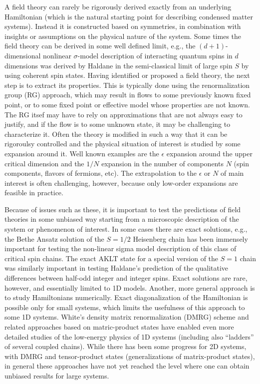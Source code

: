 \documentclass[range]{ar2e}
\begin{document}
A field theory can rarely be rigorously derived exactly from 
an underlying Hamiltonian (which is the natural starting point for describing condensed matter systems). Instead
it is constructed based on symmetries, in combination with insights or assumptions on the physical nature of the
system. Some times the field theory can be derived in some well defined limit, e.g., the $(d+1)$-dimensional
nonlinear $\sigma$-model description of interacting quantum spins in $d$ dimensions was derived by Haldane in 
the semi-classical limit of large spin $S$ by using coherent spin states. Having identified or proposed a field
theory, the next step is to extract its properties. This is typically done using the renormalization group (RG)
approach, which may result in flows to some previously known fixed point, or to some fixed point or effective
model whose properties are not known. The RG itsef may have to rely on approximations that are not always easy
to justify, and if the flow is to some unknown state, it may be challenging to characterize it. Often the theory
is modified in such a way that it can be rigoroulsy controlled and the physical situation of interest is studied 
by some expansion around it. Well known examples are the $\epsilon$ expansion around the upper critical dimension 
and the $1/N$ expansion in the number of components $N$ (spin components, flavors of fermions, etc). The
extrapolation to the $\epsilon$ or $N$ of main interest is often challenging, however, because only low-order
expansions are feasible in practice.

Because of issues such as these, it is important to test the predictions of field theories in some unbiased way
starting from a microscopic description of the system or phenomenon of interest. In some
cases there are exact solutions, e.g., the Bethe Ansatz solution of the $S=1/2$ Heisenberg chain has been immensely
important for testing the non-linear sigma model description of this class of critical spin chains. The exact
AKLT state for a special version of the $S=1$ chain was similarly important in testing Haldane's prediction of
the qualitative differences between half-odd integer and integer spins. Exact solutions are rare, however, and
essentially limited to 1D models. Another, more general approach is to study Hamiltonians numerically. Exact
diagonalization of the Hamiltonian is possible only for small systems, which limits the usefulness of this approach 
to some 1D systems. White's density matrix renormalization (DMRG) scheme and related approaches based 
on matric-product states have enabled even more detailed studies of the low-energy physics of 1D systems (including
also ``ladders'' of several coupled chains). While there has been some progress for 2D systems, with
DMRG and tensor-product states (generalizations of matrix-product states), in general these approaches have not
yet reached the level where one can obtain unbiased results for large systems.
\end{document}
